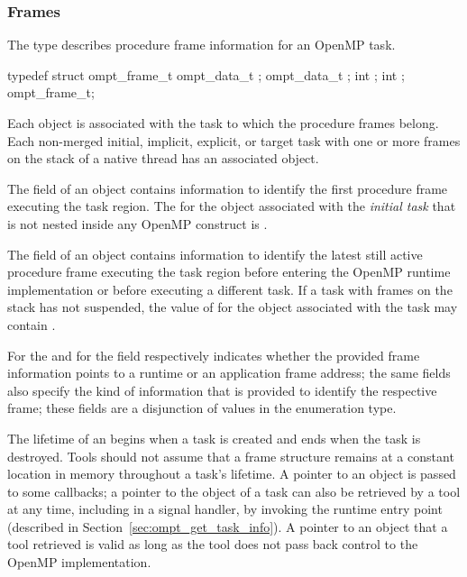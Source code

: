 \subsubsection{Frames}
\label{sec:ompt_frame_t}
\label{subsubsubsec:ompt_frame_t}

\summary
The  type describes procedure frame information for an OpenMP task.

\syntax
\begin{ccppspecific}
\begin{ompSyntax}
typedef struct ompt_frame_t {
  ompt_data_t ;
  ompt_data_t ;
  int ;
  int ;
} ompt_frame_t;
\end{ompSyntax}
\end{ccppspecific}

\descr

Each  object is associated with the task to which the procedure frames belong.
Each non-merged initial, implicit, explicit, or target task with one or more frames on
the stack of a native thread has an associated  object.

The  field of an  object contains
information to identify the first procedure frame executing the 
task region.
The  for the  object associated with 
the \emph{initial task} that is not nested inside any OpenMP construct 
is .

The  field of an  object contains
information to identify the latest still active procedure frame 
executing the task region before entering the OpenMP runtime 
implementation or before executing a different task.
If a task with frames on the stack has not suspended, the value of
 for the  object
associated with the task may contain .

For  the  and for  
the  field respectively indicates whether 
the provided frame information points to a runtime or an 
application frame address;
the same fields also specify the kind of information that is 
provided to identify the respective frame; 
these fields are a disjunction of values in the
 enumeration type.

The lifetime of an  begins when a task is created
and ends when the task is destroyed. Tools should not assume that
a frame structure remains at a constant location in memory throughout
a task's lifetime. 
A pointer to an  object is passed to
some callbacks; a pointer to the  object of a task
can also be retrieved by a tool at any time, including in a signal
handler, by invoking the
 runtime entry point (described in
Section~\ref{sec:ompt_get_task_info}).
A pointer to an  object that a tool retrieved
is valid as long as the tool does not pass back control to the OpenMP
implementation.


